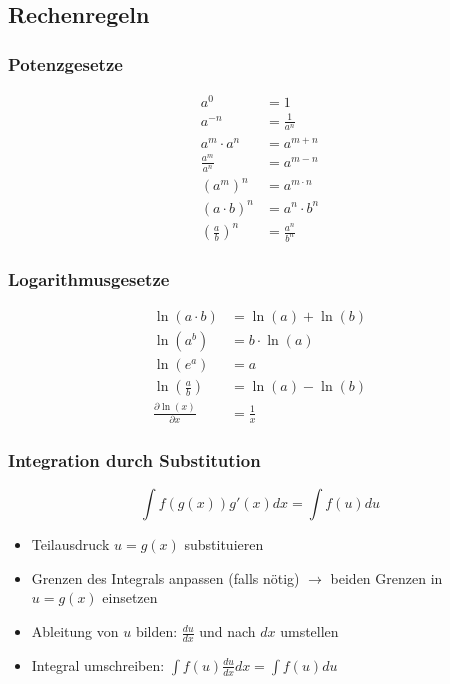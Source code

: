 \subsection{Rechenregeln}

\subsubsection{Potenzgesetze}

\begin{equation*}
    \begin{split}
        a^0 &= 1\\
        a^{-n} &= \frac{1}{a^n}\\
        a^m\cdot a^n &= a^{m+n}\\
        \frac{a^m}{a^n} &= a^{m-n}\\
        (a^m)^n &= a^{m\cdot n}\\
        (a\cdot b)^n &= a^n\cdot b^n\\
        \left(\frac{a}{b}\right)^n &= \frac{a^n}{b^n}
    \end{split}
\end{equation*}


\subsubsection{Logarithmusgesetze}
\label{logarithmusgesetze}

\begin{equation*}
    \begin{split}
        \ln(a\cdot b) &= \ln(a)+\ln(b)\\
        \ln(a^b) &= b\cdot\ln(a)\\
        \ln(e^a) &= a\\
        \ln\left(\frac{a}{b}\right) &= \ln(a)-\ln(b)\\
        \frac{\partial \ln(x)}{\partial x} &= \frac{1}{x}
    \end{split}
\end{equation*}


\subsubsection{Integration durch Substitution}
\label{substitution}

\begin{equation*}
    \int f(g(x))g'(x)dx = \int f(u)du
\end{equation*}

\begin{itemize}
    \item Teilausdruck \(u=g(x)\) substituieren
    \item Grenzen des Integrals anpassen (falls nötig) \(\rightarrow\) beiden Grenzen in \(u=g(x)\) einsetzen
    \item Ableitung von \(u\) bilden: \(\frac{du}{dx}\) und nach \(dx\) umstellen
    \item Integral umschreiben: \(\int f(u)\frac{du}{dx}dx = \int f(u)du\)
\end{itemize}


